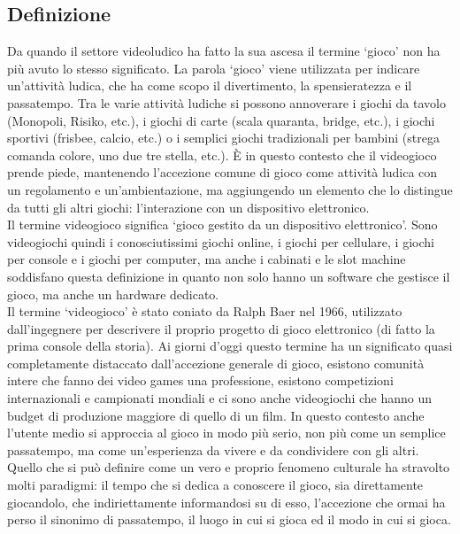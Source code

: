     \subsection{Definizione}\label{subsec:VideogiochiDef}
        Da quando il settore videoludico ha fatto la sua ascesa il termine `gioco' non ha più avuto lo stesso significato. La parola `gioco' viene utilizzata per indicare un'attività 
        ludica, che ha come scopo il divertimento, la spensieratezza e il passatempo. Tra le varie attività ludiche si possono annoverare i giochi da tavolo (Monopoli, Risiko, etc.), i 
        giochi di carte (scala quaranta, bridge, etc.), i giochi sportivi (frisbee, calcio, etc.) o i semplici giochi tradizionali per bambini (strega comanda colore, uno due tre stella, etc.).
        È in questo contesto che il videogioco prende piede, mantenendo l'accezione comune di gioco come attività ludica con un regolamento e un'ambientazione, ma aggiungendo un elemento
        che lo distingue da tutti gli altri giochi: l'interazione con un dispositivo elettronico. \\
        Il termine videogioco significa `gioco gestito da un dispositivo elettronico'. Sono videogiochi quindi i conosciutissimi giochi online, i giochi per cellulare, i giochi per console 
        e i giochi per computer, ma anche i cabinati e le slot machine soddisfano questa definizione in quanto non solo hanno un software che gestisce il gioco, ma anche un hardware dedicato.\\
        Il termine `videogioco' è stato coniato da Ralph Baer nel 1966, utilizzato dall'ingegnere per descrivere il proprio progetto di gioco elettronico (di fatto la prima console della storia).
        Ai giorni d'oggi questo termine ha un significato quasi completamente distaccato dall'accezione generale di gioco, esistono comunità intere che fanno dei video games una professione,
        esistono competizioni internazionali e campionati mondiali e ci sono anche videogiochi che hanno un budget di produzione maggiore di quello di un film. In questo contesto anche l'utente
        medio si approccia al gioco in modo più serio, non più come un semplice passatempo, ma come un'esperienza da vivere e da condividere con gli altri. Quello che si può definire come
        un vero e proprio fenomeno culturale ha stravolto molti paradigmi: il tempo che si dedica a conoscere il gioco, sia direttamente giocandolo, che indiriettamente informandosi su di esso,
        l'accezione che ormai ha perso il sinonimo di passatempo, il luogo in cui si gioca ed il modo in cui si gioca.\\ 

